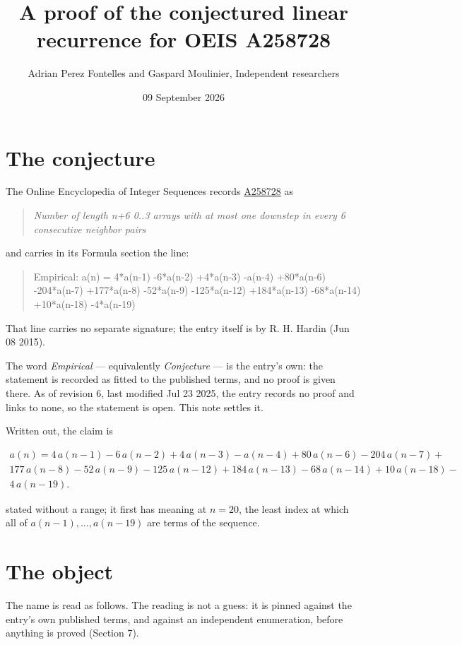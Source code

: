 \documentclass[11pt]{article}
\title{A proof of the conjectured linear recurrence for OEIS A258728}
\author{Adrian Perez Fontelles and Gaspard Moulinier, Independent researchers}
\date{09 September 2026}
\theoremstyle{definition}
\begin{document}
\maketitle
\section{The conjecture}

The Online Encyclopedia of Integer Sequences records \href{https://oeis.org/A258728}{A258728} as

\begin{quote}\itshape Number of length n+6 0..3 arrays with at most one downstep in every 6 consecutive neighbor pairs\end{quote}

and carries in its Formula section the line:

\begin{quote}\ttfamily Empirical: a(n) = 4*a(n-1) -6*a(n-2) +4*a(n-3) -a(n-4) +80*a(n-6) -204*a(n-7) +177*a(n-8) -52*a(n-9) -125*a(n-12) +184*a(n-13) -68*a(n-14) +10*a(n-18) -4*a(n-19)\end{quote}

That line carries no separate signature; the entry itself is by R. H. Hardin (Jun 08 2015).

The word {\itshape Empirical} --- equivalently {\itshape Conjecture} --- is the entry's own: the statement is recorded as fitted to the published terms, and no proof is given there. As of revision 6, last modified Jul 23 2025, the entry records no proof and links to none, so the statement is open. This note settles it.

Written out, the claim is

\begin{multline*} a(n) = 4\,a(n-1) - 6\,a(n-2) + 4\,a(n-3) - a(n-4) + 80\,a(n-6) - 204\,a(n-7) + \\ 177\,a(n-8) - 52\,a(n-9) - 125\,a(n-12) + 184\,a(n-13) - 68\,a(n-14) + 10\,a(n-18) - \\ 4\,a(n-19). \end{multline*}

stated without a range; it first has meaning at $n = 20$, the least index at which all of $a(n-1),\dots,a(n-19)$ are terms of the sequence.

\section{The object}

The name is read as follows. The reading is not a guess: it is pinned against the entry's own published terms, and against an independent enumeration, before anything is proved (Section 7).
\end{document}
